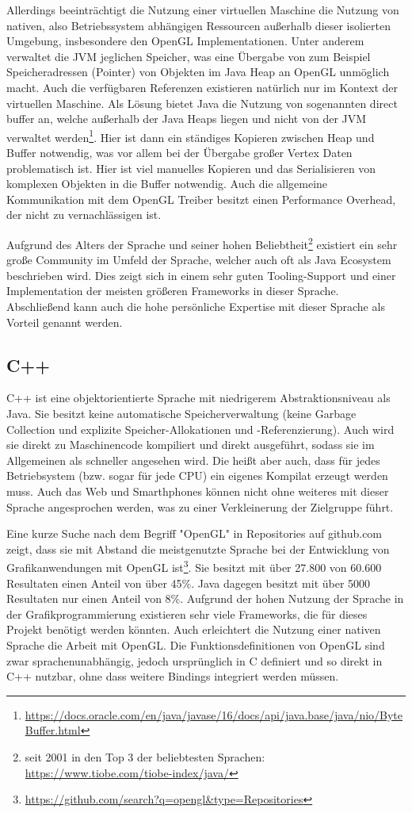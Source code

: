 Allerdings beeinträchtigt die Nutzung einer virtuellen Maschine die Nutzung von nativen, also Betriebssystem abhängigen Ressourcen außerhalb dieser isolierten Umgebung, insbesondere den OpenGL Implementationen. Unter anderem verwaltet die JVM jeglichen Speicher, was eine Übergabe von zum Beispiel Speicheradressen (Pointer) von Objekten im Java Heap an OpenGL unmöglich macht. Auch die verfügbaren Referenzen existieren natürlich nur im Kontext der virtuellen Maschine. Als Lösung bietet Java die Nutzung von sogenannten direct buffer an, welche außerhalb der Java Heaps liegen und nicht von der JVM verwaltet werden\footnote{\url{https://docs.oracle.com/en/java/javase/16/docs/api/java.base/java/nio/ByteBuffer.html}}. Hier ist dann ein ständiges Kopieren zwischen Heap und Buffer notwendig, was vor allem bei der Übergabe großer Vertex Daten problematisch ist. Hier ist viel manuelles Kopieren und das Serialisieren von komplexen Objekten in die Buffer notwendig. Auch die allgemeine Kommunikation mit dem OpenGL Treiber besitzt einen Performance Overhead, der nicht zu vernachlässigen ist.

Aufgrund des Alters der Sprache und seiner hohen Beliebtheit\footnote{seit 2001 in den Top 3 der beliebtesten Sprachen: \url{https://www.tiobe.com/tiobe-index/java/}} existiert ein sehr große Community im Umfeld der Sprache, welcher auch oft als Java Ecosystem beschrieben wird. Dies zeigt sich in einem sehr guten Tooling-Support und einer Implementation der meisten größeren Frameworks in dieser Sprache. Abschließend kann auch die hohe persönliche Expertise mit dieser Sprache als Vorteil genannt werden.

\subsection{C++}
C++ ist eine objektorientierte Sprache mit niedrigerem Abstraktionsniveau als Java. Sie besitzt keine automatische Speicherverwaltung (keine Garbage Collection und explizite Speicher-Allokationen und -Referenzierung). Auch wird sie direkt zu Maschinencode kompiliert und direkt ausgeführt, sodass sie im Allgemeinen als schneller angesehen wird. Die heißt aber auch, dass für jedes Betriebsystem (bzw. sogar für jede CPU) ein eigenes Kompilat erzeugt werden muss. Auch das Web und Smarthphones können nicht ohne weiteres mit dieser Sprache angesprochen werden, was zu einer Verkleinerung der Zielgruppe führt.

Eine kurze Suche nach dem Begriff "OpenGL" in Repositories auf github.com zeigt, dass sie mit Abstand die meistgenutzte Sprache bei der Entwicklung von Grafikanwendungen mit OpenGL ist\footnote{\url{https://github.com/search?q=opengl&type=Repositories}}. Sie besitzt mit über 27.800 von 60.600 Resultaten einen Anteil von über 45\%. Java dagegen besitzt mit über 5000 Resultaten nur einen Anteil von 8\%. Aufgrund der hohen Nutzung der Sprache in der Grafikprogrammierung existieren sehr viele Frameworks, die für dieses Projekt benötigt werden könnten. Auch erleichtert die Nutzung einer nativen Sprache die Arbeit mit OpenGL. Die Funktionsdefinitionen von OpenGL sind zwar sprachenunabhängig, jedoch ursprünglich in C definiert und so direkt in C++ nutzbar, ohne dass weitere Bindings integriert werden müssen.

